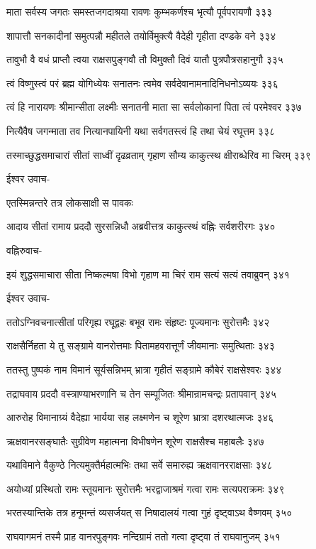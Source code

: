 माता सर्वस्य जगतः समस्तजगदाश्रया
रावणः कुम्भकर्णश्च भृत्यौ पूर्वपरायणौ ३३३

शापात्तौ सनकादीनां समुत्पन्नौ महीतले
तयोर्विमुक्त्यै वैदेही गृहीता दण्डके वने ३३४

तावुभौ वै वधं प्राप्तौ त्वया राक्षसपुङ्गवौ
तौ विमुक्तौ दिवं यातौ पुत्रपौत्रसहानुगौ ३३५

त्वं विष्णुस्त्वं परं ब्रह्म योगिध्येयः सनातनः
त्वमेव सर्वदेवानामनादिनिधनोऽव्ययः ३३६

त्वं हि नारायणः श्रीमान्सीता लक्ष्मीः सनातनी
माता सा सर्वलोकानां पिता त्वं परमेश्वर ३३७

नित्यैवैष जगन्माता तव नित्यानपायिनी
यथा सर्वगतस्त्वं हि तथा चेयं रघूत्तम ३३८

तस्माच्छुद्धसमाचारां सीतां साध्वीं दृढव्रताम्
गृहाण सौम्य काकुत्स्थ क्षीराब्धेरिव मा चिरम् ३३९

ईश्वर उवाच-

एतस्मिन्नन्तरे तत्र लोकसाक्षी स पावकः

आदाय सीतां रामाय प्रददौ सुरसन्निधौ
अब्रवीत्तत्र काकुत्स्थं वह्निः सर्वशरीरगः ३४०

वह्निरुवाच-

इयं शुद्धसमाचारा सीता निष्कल्मषा विभो
गृहाण मा चिरं राम सत्यं सत्यं तवाब्रुवन् ३४१

ईश्वर उवाच-

ततोऽग्निवचनात्सीतां परिगृह्य रघूद्वहः
बभूव रामः संहृष्टः पूज्यमानः सुरोत्तमैः ३४२

राक्षसैर्निहता ये तु सङ्ग्रामे वानरोत्तमाः
पितामहवरात्तूर्णं जीवमानाः समुत्थिताः ३४३

ततस्तु पुष्पकं नाम विमानं सूर्यसन्निभम्
भ्रात्रा गृहीतं सङ्ग्रामे कौबेरं राक्षसेश्वरः ३४४

तद्राघवाय प्रददौ वस्त्राण्याभरणानि च
तेन सम्पूजितः श्रीमान्रामचन्द्रः प्रतापवान् ३४५

आरुरोह विमानाग्र्यं वैदेह्या भार्यया सह
लक्ष्मणेन च शूरेण भ्रात्रा दशरथात्मजः ३४६

ऋक्षवानरसङ्घातैः सुग्रीवेण महात्मना
विभीषणेन शूरेण राक्षसैश्च महाबलैः ३४७

यथाविमाने वैकुण्ठे नित्यमुक्तैर्महात्मभिः
तथा सर्वे समारुह्य ऋक्षवानरराक्षसाः ३४८

अयोध्यां प्रस्थितो रामः स्तूयमानः सुरोत्तमैः
भरद्वाजाश्रमं गत्वा रामः सत्यपराक्रमः ३४९

भरतस्यान्तिके तत्र हनूमन्तं व्यसर्जयत्
स निषादालयं गत्वा गुहं दृष्ट्वाऽथ वैष्णवम् ३५०

राघवागमनं तस्मै प्राह वानरपुङ्गवः
नन्दिग्रामं ततो गत्वा दृष्ट्वा तं राघवानुजम् ३५१

